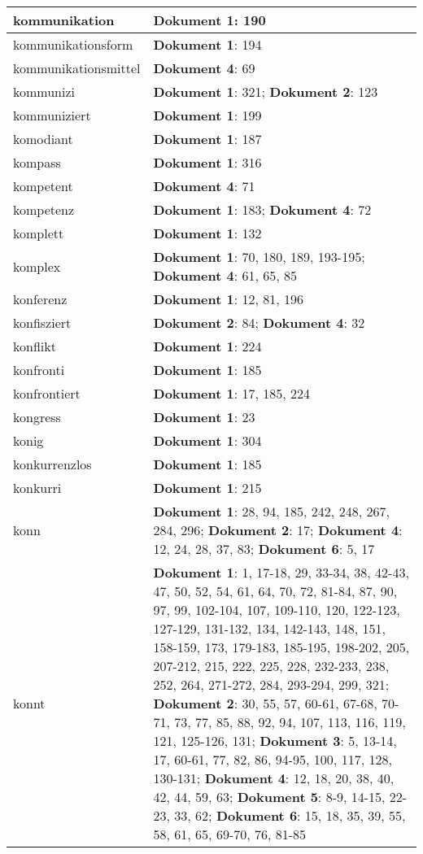 \documentclass[a5paper]{article}
\begin{document}
\begin{longtable}[l]{|l|p{3in}|}
kommunikation & \textbf{Dokument 1}: 190 \\
\hline
kommunikationsform & \textbf{Dokument 1}: 194 \\
\hline
kommunikationsmittel & \textbf{Dokument 4}: 69 \\
\hline
kommunizi & \textbf{Dokument 1}: 321; \textbf{Dokument 2}: 123 \\
\hline
kommuniziert & \textbf{Dokument 1}: 199 \\
\hline
komodiant & \textbf{Dokument 1}: 187 \\
\hline
kompass & \textbf{Dokument 1}: 316 \\
\hline
kompetent & \textbf{Dokument 4}: 71 \\
\hline
kompetenz & \textbf{Dokument 1}: 183; \textbf{Dokument 4}: 72 \\
\hline
komplett & \textbf{Dokument 1}: 132 \\
\hline
komplex & \textbf{Dokument 1}: 70, 180, 189, 193-195; \textbf{Dokument 4}: 61, 65, 85 \\
\hline
konferenz & \textbf{Dokument 1}: 12, 81, 196 \\
\hline
konfisziert & \textbf{Dokument 2}: 84; \textbf{Dokument 4}: 32 \\
\hline
konflikt & \textbf{Dokument 1}: 224 \\
\hline
konfronti & \textbf{Dokument 1}: 185 \\
\hline
konfrontiert & \textbf{Dokument 1}: 17, 185, 224 \\
\hline
kongress & \textbf{Dokument 1}: 23 \\
\hline
konig & \textbf{Dokument 1}: 304 \\
\hline
konkurrenzlos & \textbf{Dokument 1}: 185 \\
\hline
konkurri & \textbf{Dokument 1}: 215 \\
\hline
konn & \textbf{Dokument 1}: 28, 94, 185, 242, 248, 267, 284, 296; \textbf{Dokument 2}: 17; \textbf{Dokument 4}: 12, 24, 28, 37, 83; \textbf{Dokument 6}: 5, 17 \\
\hline
konnt & \textbf{Dokument 1}: 1, 17-18, 29, 33-34, 38, 42-43, 47, 50, 52, 54, 61, 64, 70, 72, 81-84, 87, 90, 97, 99, 102-104, 107, 109-110, 120, 122-123, 127-129, 131-132, 134, 142-143, 148, 151, 158-159, 173, 179-183, 185-195, 198-202, 205, 207-212, 215, 222, 225, 228, 232-233, 238, 252, 264, 271-272, 284, 293-294, 299, 321; \textbf{Dokument 2}: 30, 55, 57, 60-61, 67-68, 70-71, 73, 77, 85, 88, 92, 94, 107, 113, 116, 119, 121, 125-126, 131; \textbf{Dokument 3}: 5, 13-14, 17, 60-61, 77, 82, 86, 94-95, 100, 117, 128, 130-131; \textbf{Dokument 4}: 12, 18, 20, 38, 40, 42, 44, 59, 63; \textbf{Dokument 5}: 8-9, 14-15, 22-23, 33, 62; \textbf{Dokument 6}: 15, 18, 35, 39, 55, 58, 61, 65, 69-70, 76, 81-85 \\

\end{longtable}
\end{document}
